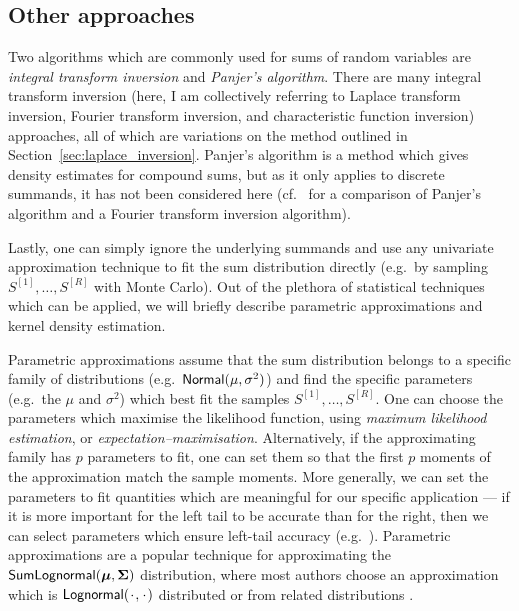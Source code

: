 \subsection{Other approaches}

Two algorithms which are commonly used for sums of random variables are \emph{integral transform inversion} and \emph{Panjer's algorithm}. There are many integral transform inversion (here, I am collectively referring to Laplace transform inversion, Fourier transform inversion, and characteristic function inversion) approaches, all of which are variations on the method outlined in Section~\ref{sec:laplace_inversion}. Panjer's algorithm is a method which gives density estimates for compound sums, but as it only applies to discrete summands, it has not been considered here (cf.\ \cite{embrechts2009panjer} for a comparison of Panjer's algorithm and a Fourier transform inversion algorithm).

Lastly, one can simply ignore the underlying summands and use any univariate approximation technique to fit the sum distribution directly (e.g.\ by sampling $S^{[1]}, \dots, S^{[R]}$ with Monte Carlo). Out of the plethora of statistical techniques which can be applied, we will briefly describe parametric approximations and kernel density estimation.

Parametric approximations assume that the sum distribution belongs to a specific family of distributions (e.g.\ $\mathsf{Normal}(\mu, \sigma^2)$) and find the specific parameters (e.g.\ the $\mu$ and  $\sigma^2$) which best fit the samples $S^{[1]}, \dots, S^{[R]}$. One can choose the parameters which maximise the likelihood function, using \emph{maximum likelihood estimation}, or \emph{expectation--maximisation}. Alternatively, if the approximating family has $p$ parameters to fit, one can set them so that the first $p$ moments of the approximation match the sample moments. More generally, we can set the parameters to fit quantities which are meaningful for our specific application --- if it is more important for the left tail to be accurate than for the right, then we can select parameters which ensure left-tail accuracy (e.g.\ \cite{hcine2015highly}). Parametric approximations are a popular technique for approximating the $\mathsf{SumLognormal}(\bm{\mu}, \bm{\Sigma})$ distribution, where most authors choose an approximation which is $\LNDist(\argdot, \argdot)$ distributed \cite{fenton1960sum,schwartz1982distribution,abu1994outage,beaulieu2004optimal,fischione2007approximation} or from related distributions \cite{beaulieu2004highly,hcine2015highly}.


